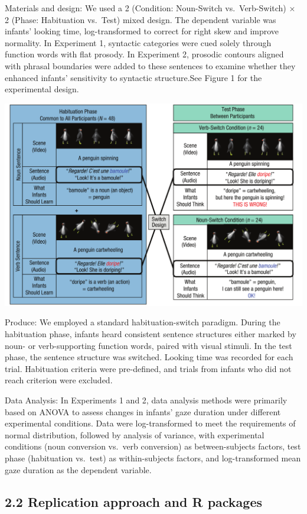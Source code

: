 \documentclass[
  man]{apa6}
\begin{document}
Materials and design: We used a 2 (Condition: Noun-Switch vs.~Verb-Switch) × 2 (Phase: Habituation vs.~Test) mixed design. The dependent variable was infants' looking time, log-transformed to correct for right skew and improve normality. In Experiment 1, syntactic categories were cued solely through function words with flat prosody. In Experiment 2, prosodic contours aligned with phrasal boundaries were added to these sentences to examine whether they enhanced infants' sensitivity to syntactic structure.See Figure 1 for the experimental design.

\includegraphics{pic/Figure_1.png}

Produce: We employed a standard habituation-switch paradigm. During the habituation phase, infants heard consistent sentence structures either marked by noun- or verb-supporting function words, paired with visual stimuli. In the test phase, the sentence structure was switched. Looking time was recorded for each trial. Habituation criteria were pre-defined, and trials from infants who did not reach criterion were excluded.

Data Analysis: In Experiments 1 and 2, data analysis methods were primarily based on ANOVA to assess changes in infants' gaze duration under different experimental conditions. Data were log-transformed to meet the requirements of normal distribution, followed by analysis of variance, with experimental conditions (noun conversion vs.~verb conversion) as between-subjects factors, test phase (habituation vs.~test) as within-subjects factors, and log-transformed mean gaze duration as the dependent variable.

\subsection{2.2 Replication approach and R packages}\label{replication-approach-and-r-packages}
\end{document}
